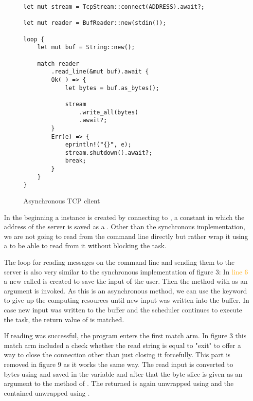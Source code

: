 \begin{figure}[h]
    \begin{verbatim}
let mut stream = TcpStream::connect(ADDRESS).await?;

let mut reader = BufReader::new(stdin());

loop {
    let mut buf = String::new();

    match reader
        .read_line(&mut buf).await {
        Ok(_) => {
            let bytes = buf.as_bytes();

            stream
                .write_all(bytes)
                .await?;
        }
        Err(e) => {
            eprintln!("{}", e);
            stream.shutdown().await?;
            break;
        }
    }
}
    \end{verbatim}
    \caption{Asynchronous TCP client}
\end{figure}

In the beginning a  instance is created by connecting to , a constant in
which the address of the server is saved as a . Other than the synchronous implementation, we are not going
to read from the command line directly but rather wrap it using a  to be able to read from
it without blocking the task.

The loop for reading messages on the command line and sending them to the server is also very similar to the
synchronous implementation of figure 3: In \textcolor{orange}{line 6} a new  called  is created
to save the input of the user. Then the  method with  as an argument is invoked. As this is
an asynchronous method, we can use the  keyword to give up the computing resources until new input was
written into the buffer. In case new input was written to the buffer and the scheduler continues to execute the task,
the return value of  is matched.

If reading was successful, the program enters the first match arm. In figure 3 this match
arm included a check whether the read string is equal to "exit" to offer a way to close the connection other than just
closing it forcefully. This part is removed in figure 9 as it works the same way. The read input is converted to bytes
using  and saved in the variable  and after that the byte slice is given as an argument to
the  method of . The returned  is again unwrapped using  and the
contained  unwrapped using .

